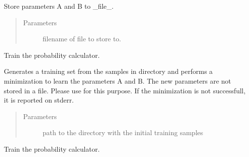 \documentclass[letterpaper,10pt,english]{sphinxmanual}
\begin{document}
\begin{fulllineitems}
\begin{fulllineitems}
\label{\detokenize{api:probability.Probability.store_to_file}}
Store parameters A and B to \_file\_.
\begin{quote}\begin{description}
\item[{Parameters}] \leavevmode
{} \textendash{} filename of file to store to.

\end{description}\end{quote}

\end{fulllineitems}


\begin{fulllineitems}
\label{\detokenize{api:probability.Probability.train_probs}}
Train the probability calculator.

Generates a training set from the samples in directory and
performs a minimization to learn the parameters A and B. The
new parameters are not stored in a file. Please use
{\hyperref[\detokenize{api:probability.Probability.store_to_file}]{}} for this purpose. If the minimization is not
successfull, it is reported on stderr.
\begin{quote}\begin{description}
\item[{Parameters}] \leavevmode
{} \textendash{} path to the directory with the initial training
samples

\end{description}\end{quote}

\end{fulllineitems}


\begin{fulllineitems}
\label{\detokenize{api:probability.Probability.train_probs_orig}}
Train the probability calculator.


\end{fulllineitems}
\end{fulllineitems}
\end{document}
